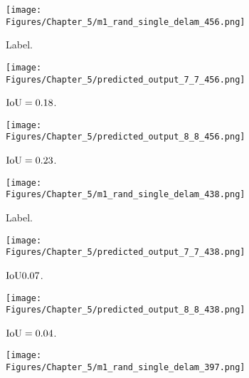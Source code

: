 \begin{figure} [h!]
	\par\medskip
	\begin{subfigure}[b]{0.32\textwidth}
		\centering
		\texttt{[image: Figures/Chapter\_5/m1\_rand\_single\_delam\_456.png]}
		\caption{Label.}
		\label{fig:GT_case_456}
	\end{subfigure}	
	\hfill
	\begin{subfigure}[b]{0.32\textwidth}
		\centering
		\texttt{[image: Figures/Chapter\_5/predicted\_output\_7\_7\_456.png]}
		\caption{\(\textup{IoU}=0.18\).}
		\label{fig:pred_7_7_case_456}
	\end{subfigure}
	\hfill
	\begin{subfigure}[b]{0.32\textwidth}
		\centering
		\texttt{[image: Figures/Chapter\_5/predicted\_output\_8\_8\_456.png]}
		\caption{\(\textup{IoU}=0.23\).}
		\label{fig:pred_8_8_case_456}
	\end{subfigure}	
	\par\medskip
	\begin{subfigure}[b]{0.32\textwidth}
		\centering
		\texttt{[image: Figures/Chapter\_5/m1\_rand\_single\_delam\_438.png]}
		\caption{Label.}
		\label{fig:GT_case_438}
	\end{subfigure}
	\hfill
	\begin{subfigure}[b]{0.32\textwidth}
		\centering
		\texttt{[image: Figures/Chapter\_5/predicted\_output\_7\_7\_438.png]}
		\caption{\(\textup{IoU}0.07\).}
		\label{fig:pred_7_7_case_438}
	\end{subfigure}
	\hfill
	\begin{subfigure}[b]{0.32\textwidth}
		\centering
		\texttt{[image: Figures/Chapter\_5/predicted\_output\_8\_8\_438.png]}
		\caption{\(\textup{IoU}=0.04\).}
		\label{fig:pred_8_8_case_438}
	\end{subfigure}
	\par\medskip
	\begin{subfigure}[b]{0.32\textwidth}
		\centering
		\texttt{[image: Figures/Chapter\_5/m1\_rand\_single\_delam\_397.png]}

\end{subfigure}
\end{figure}
